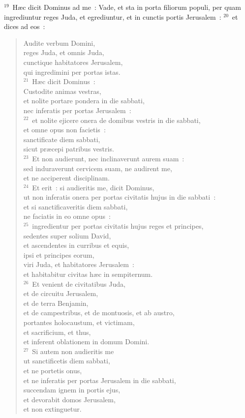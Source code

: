 ${}^{19}$~H\ae c dicit Dominus ad me~: Vade, et sta in porta filiorum populi, per quam ingrediuntur reges Juda, et egrediuntur, et in cunctis portis Jerusalem~:
${}^{20}$~et dices ad eos~: \begin{verse}Audite verbum Domini,\\ reges Juda, et omnis Juda,\\ cunctique habitatores Jerusalem,\\ qui ingredimini per portas istas.\\
${}^{21}$~H\ae c dicit Dominus~:\\ Custodite animas vestras,\\ et nolite portare pondera in die sabbati,\\ nec inferatis per portas Jerusalem~:\\
${}^{22}$~et nolite ejicere onera de domibus vestris in die sabbati,\\ et omne opus non facietis~:\\ sanctificate diem sabbati,\\ sicut pr\ae cepi patribus vestris.\\
${}^{23}$~Et non audierunt, nec inclinaverunt aurem suam~:\\ sed induraverunt cervicem suam, ne audirent me,\\ et ne acciperent disciplinam.\\
${}^{24}$~Et erit~: si audieritis me, dicit Dominus,\\ ut non inferatis onera per portas civitatis hujus in die sabbati~:\\ et si sanctificaveritis diem sabbati,\\ ne faciatis in eo omne opus~:\\
${}^{25}$~ingredientur per portas civitatis hujus reges et principes,\\ sedentes super solium David,\\ et ascendentes in curribus et equis,\\ ipsi et principes eorum,\\ viri Juda, et habitatores Jerusalem~:\\ et habitabitur civitas h\ae c in sempiternum.\\
${}^{26}$~Et venient de civitatibus Juda,\\ et de circuitu Jerusalem,\\ et de terra Benjamin,\\ et de campestribus, et de montuosis, et ab austro,\\ portantes holocaustum, et victimam,\\ et sacrificium, et thus,\\ et inferent oblationem in domum Domini.\\
${}^{27}$~Si autem non audieritis me\\ ut sanctificetis diem sabbati,\\ et ne portetis onus,\\ et ne inferatis per portas Jerusalem in die sabbati,\\ succendam ignem in portis ejus,\\ et devorabit domos Jerusalem,\\ et non extinguetur.\end{verse}
